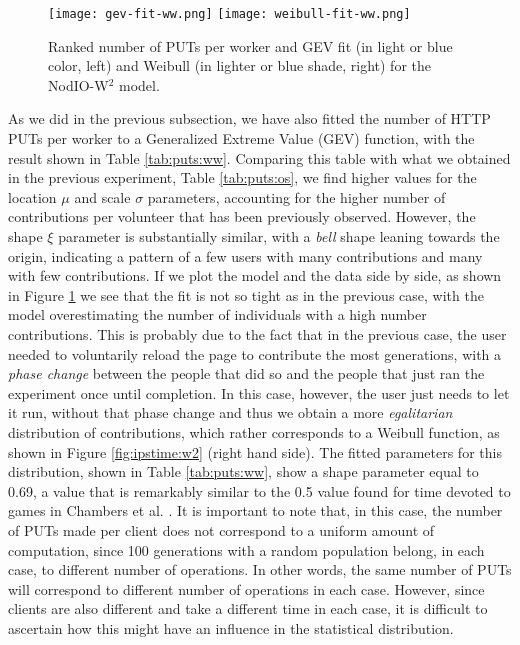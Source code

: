 \documentclass[journal,onecolumn]{IEEEtran}
\begin{document}
\begin{figure}[!htb]
\centering
\texttt{[image: gev-fit-ww.png]}
\texttt{[image: weibull-fit-ww.png]}
\caption{Ranked number of PUTs per worker and GEV fit (in light
  or blue color, left) 
and Weibull (in lighter or blue shade, right) for the {\sf NodIO-W$^2$} model.}  
\label{fig:gev:w2}
\end{figure}
%
As we did in the previous subsection, we have also fitted the number
of HTTP PUTs per worker to a  Generalized Extreme Value (GEV) function, with the result shown
in Table \ref{tab:puts:ww}. Comparing this table with what we obtained
in the previous experiment, Table \ref{tab:puts:os}, we find higher values
for the location $\mu$ and scale $\sigma$ parameters, accounting for
the higher number of contributions per volunteer that has been
previously observed. However, the shape $\xi$ parameter is
substantially similar, with a {\em bell} shape leaning towards the
origin, indicating a pattern of a few users with many contributions
and many with few contributions. If we plot the model and the data
side by side, as shown in Figure \ref{fig:gev:w2} we see that the fit
is not so tight as in the previous case, with the model overestimating
the number of individuals with a high number contributions. This is
probably due to the fact that in the previous case, the user needed to
voluntarily reload the page to contribute the most generations, with a
{\em phase change} between the people that did so and the people that
just ran the experiment once until completion. In this case, however, the
user just needs to let it run, without that phase change and thus we obtain a
more {\em egalitarian} distribution of contributions, which rather
corresponds to a Weibull function, as shown in Figure
\ref{fig:ipstime:w2} (right hand side). The fitted parameters for this
distribution, shown in Table \ref{tab:puts:ww}, show a shape parameter
equal to 0.69, a value that is remarkably similar to the 0.5 value
found for time devoted to games in Chambers et
al. \cite{chambers2005measurement}. It is important to note that, in
this case, the number of PUTs made per client does not correspond to a
uniform amount of computation, since 100 generations with a random
population belong, in each case, to different number of
operations. In other words, the same number of PUTs will correspond to
different number of operations in each case. However, since clients
are also different and take a different time in each case, it is
difficult to ascertain how this might have an influence in the
statistical distribution.
\end{document}
